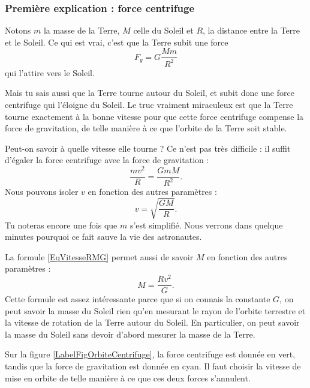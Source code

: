 \subsubsection{Première explication : force centrifuge}

Notons $m$ la masse de la Terre, $M$ celle du Soleil et $R$, la distance entre la Terre et le Soleil. Ce qui est vrai, c'est que la Terre subit une force 
\begin{equation}
	F_g=G\frac{ Mm }{ R^2 }
\end{equation}
qui l'attire vers le Soleil.

Mais tu sais aussi que la Terre tourne autour du Soleil, et subit donc une force centrifuge qui l'éloigne du Soleil. Le truc vraiment miraculeux est que la Terre tourne exactement à la bonne vitesse pour que cette force centrifuge compense la force de gravitation, de telle manière à ce que l'orbite de la Terre soit stable.

Peut-on savoir à quelle vitesse elle tourne ? Ce n'est pas très difficile : il suffit d'égaler la force centrifuge avec la force de gravitation :
\begin{equation}
	\frac{ mv^2 }{ R }=\frac{ GmM }{ R^2 }.
\end{equation}
Nous pouvons isoler $v$ en fonction des autres paramètres :
\begin{equation}			\label{EqVitesseRMG}
	v=\sqrt{\frac{ GM }{ R }}.
\end{equation}
Tu noteras encore une fois que $m$ s'est simplifié. Nous verrons dans quelque minutes pourquoi ce fait sauve la vie des astronautes.

La formule \eqref{EqVitesseRMG} permet aussi de savoir $M$ en fonction des autres paramètres :
\begin{equation}
	M=\frac{ Rv^2 }{ G }.
\end{equation}
Cette formule est assez intéressante parce que si on connais la constante $G$, on peut savoir la masse du Soleil rien qu'en mesurant le rayon de l'orbite terrestre et la vitesse de rotation de la Terre autour du Soleil. En particulier, on peut savoir la masse du Soleil sans devoir d'abord mesurer la masse de la Terre.

Sur la figure \ref{LabelFigOrbiteCentrifuge}, la force centrifuge est donnée en vert, tandis que la force de gravitation est donnée en cyan. Il faut choisir la vitesse de mise en orbite de telle manière à ce que ces deux forces s'annulent.
\newcommand{\CaptionFigOrbiteCentrifuge}{L'art de la mise en orbite est de donner la vitesse exacte qu'il faut pour que la force de gravitation soit exactement compensée par la force centrifuge.}


